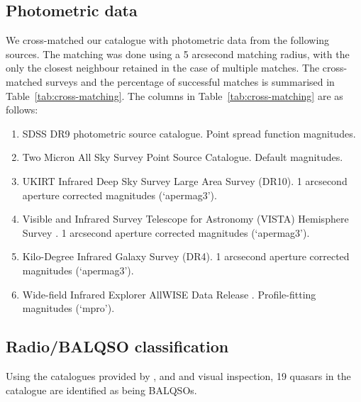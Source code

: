 \subsection{Photometric data}

We cross-matched our catalogue with photometric data from the following sources. 
The matching was done using a 5 arcsecond matching radius, with the only the closest neighbour retained in the case of multiple matches. 
The cross-matched surveys and the percentage of successful matches is summarised in Table~\ref{tab:cross-matching}. 
The columns in Table~\ref{tab:cross-matching} are as follows:

\begin{enumerate}

 \item SDSS DR9 photometric source catalogue. Point spread function magnitudes. 

 \item Two Micron All Sky Survey \citep[2MASS;][]{skrutskie06} Point Source Catalogue. Default magnitudes.

 \item UKIRT Infrared Deep Sky Survey \citep[UKIDSS;][]{lawrence07} Large Area Survey (DR10). 1 arcsecond aperture corrected magnitudes (`apermag3').   

 \item Visible and Infrared Survey Telescope for Astronomy (VISTA) Hemisphere Survey \citep[VHS;][]{mcmahon13}. 1 arcsecond aperture corrected magnitudes (`apermag3').   

 \item Kilo-Degree Infrared Galaxy \citep[VIKING;][]{edge13} Survey (DR4). 1 arcsecond aperture corrected magnitudes (`apermag3').

 \item Wide-field Infrared Explorer \citep[WISE;][]{wright10} AllWISE Data Release \citep{mainzer11}. Profile-fitting magnitudes (`mpro').

\end{enumerate}

\subsection{Radio/BALQSO classification}

Using the catalogues provided by \citet{shen11}, \citet{allen11} and \citet{paris17} and visual inspection, 19 quasars in the catalogue are identified as being  BALQSOs.  

